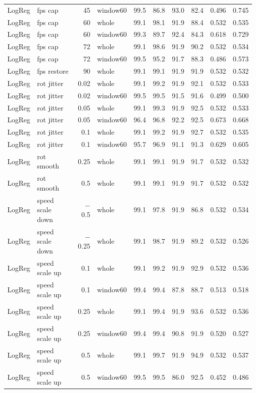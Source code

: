 \begin{longtable}{llrlrrrrrr}
LogReg & fps cap & 45 & window60 & 99.5 & 86.8 & 93.0 & 82.4 & 0.496 & 0.745 \\
LogReg & fps cap & 60 & whole & 99.1 & 98.1 & 91.9 & 88.4 & 0.532 & 0.535 \\
LogReg & fps cap & 60 & window60 & 99.3 & 89.7 & 92.4 & 84.3 & 0.618 & 0.729 \\
LogReg & fps cap & 72 & whole & 99.1 & 98.6 & 91.9 & 90.2 & 0.532 & 0.534 \\
LogReg & fps cap & 72 & window60 & 99.5 & 95.2 & 91.7 & 88.3 & 0.486 & 0.573 \\
LogReg & fps restore & 90 & whole & 99.1 & 99.1 & 91.9 & 91.9 & 0.532 & 0.532 \\
LogReg & rot jitter & 0.02 & whole & 99.1 & 99.2 & 91.9 & 92.1 & 0.532 & 0.533 \\
LogReg & rot jitter & 0.02 & window60 & 99.5 & 99.5 & 91.5 & 91.6 & 0.499 & 0.500 \\
LogReg & rot jitter & 0.05 & whole & 99.1 & 99.3 & 91.9 & 92.5 & 0.532 & 0.533 \\
LogReg & rot jitter & 0.05 & window60 & 96.4 & 96.8 & 92.2 & 92.5 & 0.673 & 0.668 \\
LogReg & rot jitter & 0.1 & whole & 99.1 & 99.2 & 91.9 & 92.7 & 0.532 & 0.535 \\
LogReg & rot jitter & 0.1 & window60 & 95.7 & 96.9 & 91.1 & 91.3 & 0.629 & 0.605 \\
LogReg & rot smooth & 0.25 & whole & 99.1 & 99.1 & 91.9 & 91.7 & 0.532 & 0.532 \\
LogReg & rot smooth & 0.5 & whole & 99.1 & 99.1 & 91.9 & 91.7 & 0.532 & 0.532 \\
LogReg & speed scale down & $-$0.5 & whole & 99.1 & 97.8 & 91.9 & 86.8 & 0.532 & 0.534 \\
LogReg & speed scale down & $-$0.25 & whole & 99.1 & 98.7 & 91.9 & 89.2 & 0.532 & 0.526 \\
LogReg & speed scale up & 0.1 & whole & 99.1 & 99.2 & 91.9 & 92.9 & 0.532 & 0.536 \\
LogReg & speed scale up & 0.1 & window60 & 99.4 & 99.4 & 87.8 & 88.7 & 0.513 & 0.518 \\
LogReg & speed scale up & 0.25 & whole & 99.1 & 99.4 & 91.9 & 93.6 & 0.532 & 0.536 \\
LogReg & speed scale up & 0.25 & window60 & 99.4 & 99.4 & 90.8 & 91.9 & 0.520 & 0.527 \\
LogReg & speed scale up & 0.5 & whole & 99.1 & 99.7 & 91.9 & 94.9 & 0.532 & 0.537 \\
LogReg & speed scale up & 0.5 & window60 & 99.5 & 99.5 & 86.0 & 92.5 & 0.452 & 0.486 \\

\end{longtable}
